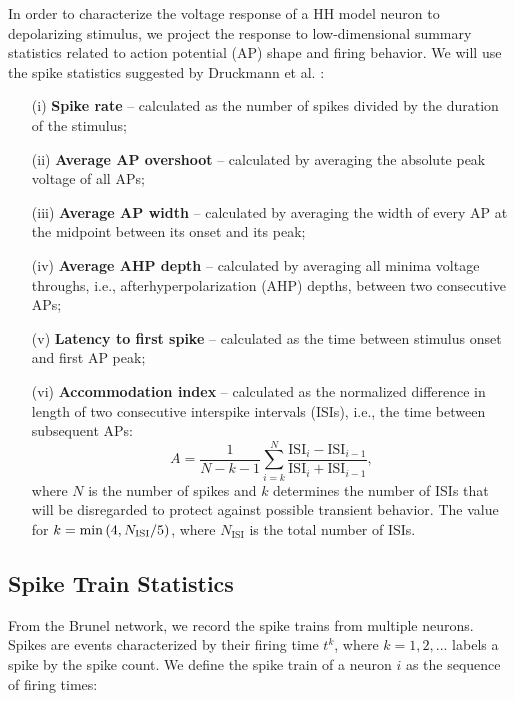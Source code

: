 In order to characterize the voltage response of a HH model neuron to depolarizing stimulus, we project the response to low-dimensional summary statistics related to action potential (AP) shape and firing behavior. We will use the spike statistics suggested by Druckmann et al. \cite{druckmann}:

\begin{enumerate}
    \item[(i)] \textbf{Spike rate} -- calculated as the number of spikes divided by the duration of the stimulus;
    \item[(ii)] \textbf{Average AP overshoot} -- calculated by averaging the absolute peak voltage of all APs;
    \item[(iii)] \textbf{Average AP width} -- calculated by averaging the width of every AP at the midpoint between its onset and its peak; 
    \item[(iv)] \textbf{Average AHP depth} -- calculated by averaging all minima voltage throughs, i.e., afterhyperpolarization (AHP) depths, between two consecutive APs;
    \item[(v)] \textbf{Latency to first spike} -- calculated as the time between stimulus onset and first AP peak;
    \item[(vi)] \textbf{Accommodation index} -- calculated as the normalized difference in length of two consecutive interspike intervals (ISIs), i.e., the time between subsequent APs:
    \begin{equation}\label{eq:accomm_index}
        A = \frac{1}{N -k - 1} \sum_{i=k}^N \frac{\mathrm{ISI}_i - \mathrm{ISI}_{i-1}}{\mathrm{ISI}_i + \mathrm{ISI}_{i-1}},
    \end{equation}
    where $N$ is the number of spikes and $k$ determines the number of ISIs that will be disregarded to protect against possible transient behavior. The value for $k = \min \qty(4, N_\mathrm{ISI}/5)$, where $N_\mathrm{ISI}$ is the total number of ISIs. 
\end{enumerate}



\subsection{Spike Train Statistics}\label{sec:spiketrain_statistics}

From the Brunel network, we record the spike trains from multiple neurons.
Spikes are events characterized by their firing time $t^k$, where $k=1, 2, ...$ labels a spike by the spike count. We define the spike train of a neuron $i$ as the sequence of firing times: 

